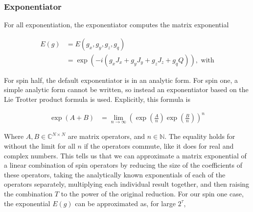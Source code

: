 \documentclass{jors}
\begin{document}
		\subsubsection*{Exponentiator}
			For all exponentiation, the exponentiator computes the matrix exponential
			
			\begin{align}
				E(g) &= E(g_x, g_y, g_z, g_q)\\
				&= \exp(-i (g_x J_x + g_y J_y + g_z J_z + g_q Q)), \textrm{ with}
			\end{align}
			
			For spin half, the default exponentiator is in an analytic form. For spin one, a simple analytic form cannot be written, so instead an exponentiator based on the Lie Trotter product formula \cite{moler_nineteen_2003} is used. Explicitly, this formula is
			
			\begin{align}
				\exp\left( A + B\right) &= \lim_{n\to\infty} \left(\exp\left(\frac{A}{n}\right) \exp\left(\frac{B}{n}\right)\right)^n
			\end{align}
			
			Where \(A,B\in\mathbb{C}^{N\times N}\) are matrix operators, and \(n\in\mathbb{N}\). The equality holds for without the limit for all \(n\) if the operators commute, like it does for real and complex numbers. This tells us that we can approximate a matrix exponential of a linear combination of spin operators by reducing the size of the coefficients of these operators, taking the analytically known exponentials of each of the operators separately, multiplying each individual result together, and then raising the combination \(T\) to the power of the original reduction. For our spin one case, the exponential \(E(g)\) can be approximated as, for large \(2^\tau\),

\end{document}
